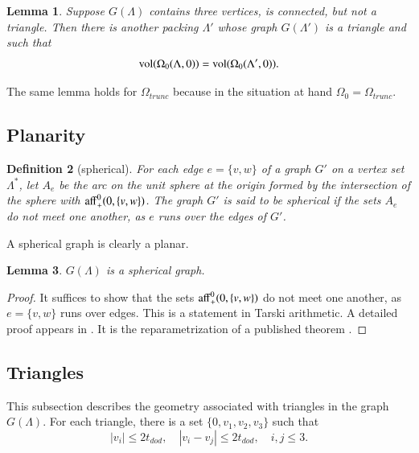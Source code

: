 \documentclass{article} %
\newtheorem{lemma}{Lemma}[subsection]
\newtheorem{definition}[lemma]{Definition}
\begin{document}
\begin{lemma}\label{lemma:3tri}  
Suppose $G(\Lambda)$ contains three vertices,
is connected, but not a triangle.  Then there is another packing
$\Lambda'$ whose graph $G(\Lambda')$ is a triangle and such
that
$$
{\operatorname{vol}}(\Omega_0(\Lambda,0)) = {\operatorname{vol}}(\Omega_0(\Lambda',0)).
$$
\end{lemma}

The same lemma holds for $\Omega_{trunc}$ because in the situation at
hand $\Omega_0=\Omega_{trunc}$. 

\subsection{Planarity}

\begin{definition}[spherical]
For each edge $e=\{v,w\}$ of a graph $G'$ on a vertex set $\Lambda^*$, 
let $A_e$ be the
arc on the unit sphere at the origin formed by the intersection of the
sphere with ${\operatorname{aff}}^0_+(0,\{v,w\})$. The graph $G'$  is said to be \emph{spherical} if the sets $A_e$ do not meet
one another, as $e$ runs over the edges of $G'$.
\end{definition}

A spherical graph is clearly a planar.

\begin{lemma}\label{lemma:planar}  
$G(\Lambda)$ is a spherical graph.
\end{lemma}

\begin{proof} 
  It suffices to show that the sets
  ${\operatorname{aff}}^0_+(0,\{v,w\})$ do not meet one another, as $e=\{v,w\}$
  runs over edges.  This is a statement in Tarski arithmetic.
  A detailed proof appears in \cite[Lemma~3.2]{Hales:2002:Dodec}.  
  It is the reparametrization
  of a published theorem \cite[Lemma~3.10]{Hales:1997:DCG}.
\end{proof}


\subsection{Triangles}

This subsection describes the geometry associated with
triangles in the graph $G(\Lambda)$.  For each triangle,
there is a set $\{0,v_1,v_2,v_3\}$ such that
\begin{equation}\label{eqn:qrtet}
  |v_i| \le 2t_{dod},\quad |v_i-v_j | \le 2 t_{dod},\quad i,j\le 3.
\end{equation}
\end{document}
